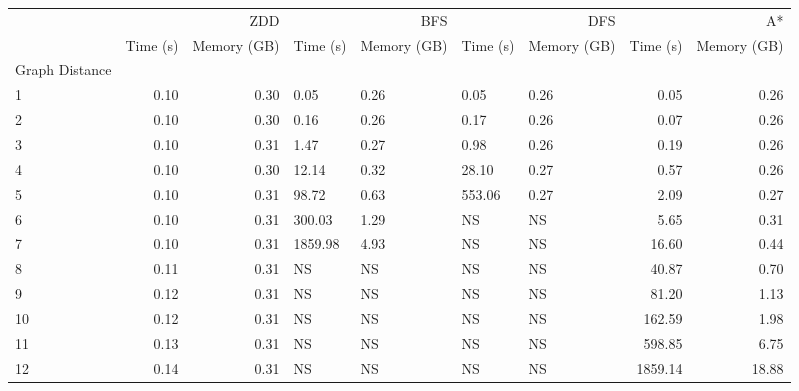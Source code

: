 \begin{tabular}{lrrllllrr}
\toprule
 & \multicolumn{2}{r}{ZDD} & \multicolumn{2}{r}{BFS} & \multicolumn{2}{r}{DFS} & \multicolumn{2}{r}{A*} \\
 & Time (s) & Memory (GB) & Time (s) & Memory (GB) & Time (s) & Memory (GB) & Time (s) & Memory (GB) \\
Graph Distance &  &  &  &  &  &  &  &  \\
\midrule
1 & 0.10 & 0.30 & 0.05 & 0.26 & 0.05 & 0.26 & 0.05 & 0.26 \\
2 & 0.10 & 0.30 & 0.16 & 0.26 & 0.17 & 0.26 & 0.07 & 0.26 \\
3 & 0.10 & 0.31 & 1.47 & 0.27 & 0.98 & 0.26 & 0.19 & 0.26 \\
4 & 0.10 & 0.30 & 12.14 & 0.32 & 28.10 & 0.27 & 0.57 & 0.26 \\
5 & 0.10 & 0.31 & 98.72 & 0.63 & 553.06 & 0.27 & 2.09 & 0.27 \\
6 & 0.10 & 0.31 & 300.03 & 1.29 & NS & NS & 5.65 & 0.31 \\
7 & 0.10 & 0.31 & 1859.98 & 4.93 & NS & NS & 16.60 & 0.44 \\
8 & 0.11 & 0.31 & NS & NS & NS & NS & 40.87 & 0.70 \\
9 & 0.12 & 0.31 & NS & NS & NS & NS & 81.20 & 1.13 \\
10 & 0.12 & 0.31 & NS & NS & NS & NS & 162.59 & 1.98 \\
11 & 0.13 & 0.31 & NS & NS & NS & NS & 598.85 & 6.75 \\
12 & 0.14 & 0.31 & NS & NS & NS & NS & 1859.14 & 18.88 \\
\bottomrule
\end{tabular}
